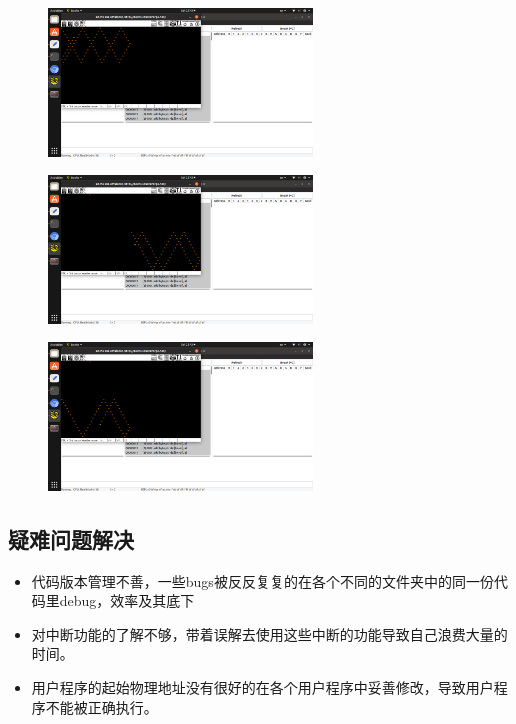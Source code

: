 \documentclass[a4paper,11pt,UTF8]{ctexart}
\begin{document}
\begin{figure}[htbp]{
	\centering
		\includegraphics[width=7cm]{Screenshot from 2019-03-23 22-43-19.png}
	\quad
}
\end{figure}
\begin{figure}[htbp]{
	\centering
		\includegraphics[width=7cm]{Screenshot from 2019-03-23 22-43-33.png}
		\quad
}
\end{figure}
\begin{figure}[htbp]{
	\centering
		\includegraphics[width=7cm]{Screenshot from 2019-03-23 22-43-41.png}
		\quad
	}
\end{figure}
\subsection{疑难问题解决}
	
	\begin{itemize}
		\item 代码版本管理不善，一些bugs被反反复复的在各个不同的文件夹中的同一份代码里debug，效率及其底下
	
		
		\item 对中断功能的了解不够，带着误解去使用这些中断的功能导致自己浪费大量的时间。
		
		\item 用户程序的起始物理地址没有很好的在各个用户程序中妥善修改，导致用户程序不能被正确执行。
	\end{itemize}
\end{document}
